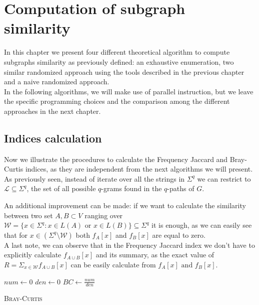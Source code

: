\chapter{Computation of subgraph similarity}

	In this chapter we present four different theoretical algorithm to compute subgraphs similarity as previously defined: an exhaustive enumeration, two similar randomized approach using the tools described in the previous chapter and a naive randomized approach.\\
	
	In the following algorithms, we will make use of parallel instruction, but we leave the specific programming choices and the comparison among the different approaches in the next chapter.
	
\section{Indices calculation}

Now we illustrate the procedures to calculate the Frequency Jaccard and Bray-Curtis indices, as they are independent from the next algorithms we will present.\\

As previously seen, instead of iterate over all the strings in $\Sigma^{q}$ we can restrict to $\mathcal{L} \subseteq \Sigma^{q}$, the set of all possible $q$-grams found in the $q$-paths of $G$. 

An additional improvement can be made: if we want to calculate the similarity between two set $A, B \subset V$ ranging over $\mathcal{W} = \{ x \in \Sigma^{q} : x \in L(A) \text{ or } x \in L(B) \} \subseteq \Sigma^{q}$ it is enough, as we can easily see that for $x \in ( \Sigma^{q} \setminus \mathcal{W} )$ both $f_A[x]$ and $f_B[x]$ are equal to zero.\\

A last note, we can observe that in the Frequency Jaccard index we don't have to explicitly calculate $f_{A \cup B}[x]$ and its summary, as the exact value of $R = \Sigma_{x \in \mathcal{W}} f_{A \cup B}[x]$ can be easily calculate from $f_{A}[x] \text{ and } f_{B}[x]$.\\

\begin{algorithm}[h]
	\small
	\DontPrintSemicolon
	\BlankLine
	$num \gets 0$\;
	$den \gets 0$\;
	$BC \gets \frac{num}{den}$\;
	\caption{\textsc{Bray-Curtis}}
	\label{alg:bray-curtis}
\end{algorithm}

